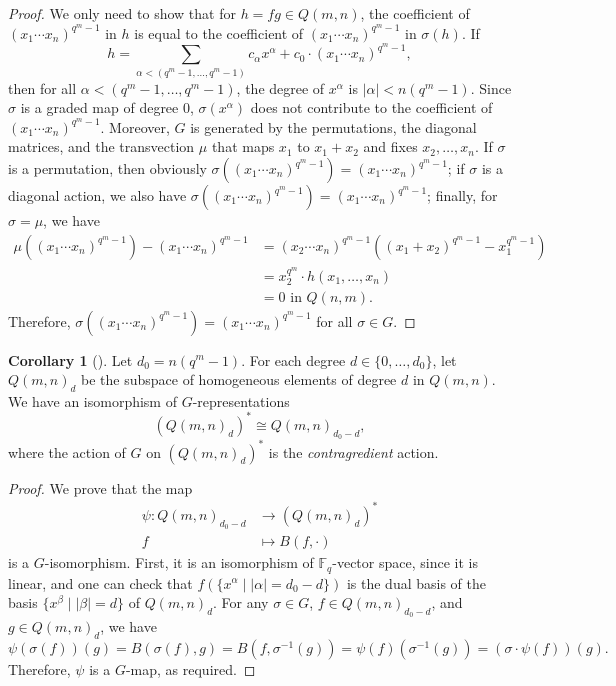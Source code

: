 \documentclass[12pt,a4paper]{report}
\theoremstyle{definition}
\newtheorem{corollary}{Corollary}[theorem]
\theoremstyle{remark}
\theoremstyle{definition}
\begin{document}
\begin{proof}
    We only need to show that for $h = fg\in Q(m, n)$, the coefficient of $(x_1\cdots x_n)^{q^m-1}$ in $h$ is equal to the coefficient of $(x_1\cdots x_n)^{q^m-1}$ in $\sigma(h)$. If 
    \begin{equation*}
        h = \sum\limits_{\alpha < (q^m-1, \ldots, q^m-1)}c_{\alpha} x^{\alpha} + c_0 \cdot (x_1\cdots x_n)^{q^m-1},
    \end{equation*}
    then for all $\alpha < (q^m-1, \ldots, q^m-1)$, the degree of $x^{\alpha}$ is $|\alpha|< n(q^m-1)$. Since $\sigma$ is a graded map of degree $0$, $\sigma(x^{\alpha})$ does not contribute to the coefficient of $(x_1\cdots x_n)^{q^m-1}$. Moreover, $G$ is generated by the permutations, the diagonal matrices, and the transvection $\mu$ that maps $x_1$ to $x_1+x_2$ and fixes $x_2, \ldots, x_n$. If $\sigma$ is a permutation, then obviously $\sigma((x_1\cdots x_n)^{q^m-1}) = (x_1\cdots x_n)^{q^m-1}$; if $\sigma$ is a diagonal action, we also have $\sigma((x_1\cdots x_n)^{q^m-1}) = (x_1\cdots x_n)^{q^m-1}$; finally, for $\sigma=\mu$, we have
    \begin{align*}
        \mu((x_1\cdots x_n)^{q^m-1}) - (x_1\cdots x_n)^{q^m-1} &= (x_2\cdots x_n)^{q^m-1} ((x_1+x_2)^{q^m-1}-x_1^{q^m-1})\\
        &=x_2^{q^m}\cdot h(x_1, \ldots, x_n)\\
        &=0 \text{ in $Q(n, m)$.}
    \end{align*}
    Therefore, $\sigma((x_1\cdots x_n)^{q^m-1}) = (x_1\cdots x_n)^{q^m-1}$ for all $\sigma\in G$.
\end{proof}
\begin{corollary}[{\cite[Corollary 3.4]{Lewis_Reiner_Stanton_2017}}]\label{cor:poincare_duality}
    Let $d_0 = n(q^m-1)$. For each degree $d\in \{0, \ldots, d_0\}$, let $Q(m, n)_d$ be the subspace of homogeneous elements of degree $d$ in $Q(m, n)$. We have an isomorphism of $G$-representations
    \begin{equation*}
        (Q(m, n)_d)^{*} \cong Q(m, n)_{d_0-d},
    \end{equation*}
    where the action of $G$ on $(Q(m, n)_d)^{*}$ is the \emph{contragredient} action.
\end{corollary}
\begin{proof}
    We prove that the map
    \begin{align*}
        \psi: Q(m, n)_{d_0-d} &\to (Q(m, n)_{d})^{*}\\
        f&\mapsto B(f, \cdot)
    \end{align*}
    is a $G$-isomorphism. First, it is an isomorphism of $\mathbb{F}_q$-vector space, since it is linear, and one can check that $f(\{x^{\alpha}\mid |\alpha| = d_0-d\})$ is the dual basis of the basis $\{x^{\beta}\mid |\beta| =d\}$ of $Q(m, n)_d$. For any $\sigma\in G$, $f\in Q(m, n)_{d_0-d}$, and $g\in Q(m, n)_d$, we have
    \begin{equation*}
        \psi(\sigma(f))(g) = B(\sigma(f), g) = B(f, \sigma^{-1}(g)) = \psi(f)(\sigma^{-1}(g)) = (\sigma\cdot \psi(f))(g).
    \end{equation*}
    Therefore, $\psi$ is a $G$-map, as required.
\end{proof}
\end{document}
